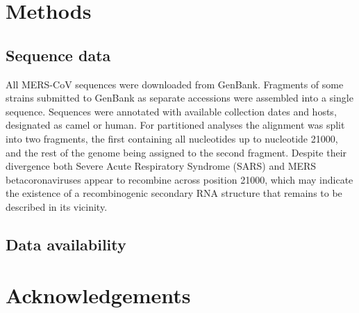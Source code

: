 \documentclass[11pt,oneside,letterpaper]{article}
\begin{document}
\subsection*{}

\newpage

\section*{Methods}
\subsection*{Sequence data}
All MERS-CoV sequences were downloaded from GenBank.
Fragments of some strains submitted to GenBank as separate accessions were assembled into a single sequence.
Sequences were annotated with available collection dates and hosts, designated as camel or human.
For partitioned analyses the alignment was split into two fragments, the first containing all nucleotides up to nucleotide 21000, and the rest of the genome being assigned to the second fragment.
Despite their divergence both Severe Acute Respiratory Syndrome (SARS) and MERS betacoronaviruses appear to recombine across position 21000, which may indicate the existence of a recombinogenic secondary RNA structure that remains to be described in its vicinity. %

\subsection*{Data availability}


\section*{Acknowledgements}



\end{document}

